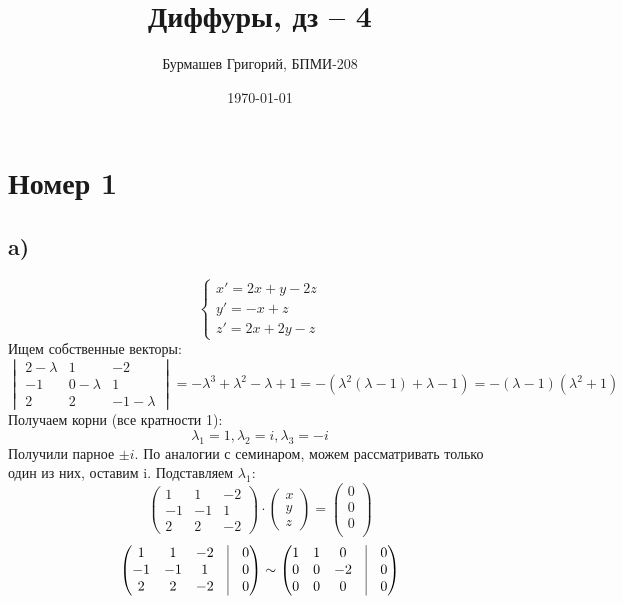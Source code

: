 \documentclass[a4paper,12pt]{article}
\author{Бурмашев Григорий, БПМИ-208}
\title{Диффуры, дз -- 4}
\date{\today}
\begin{document}
\maketitle
\clearpage
\section*{Номер 1}
\subsection*{a)}
\[
\begin{cases}
x' = 2x + y - 2z \\
y' = -x + z \\
z' = 2x + 2y - z
\end{cases}
\]
Ищем собственные векторы:
\[
\begin{vmatrix}
2 - \lambda & 1 & -2 \\
-1 & 0 - \lambda & 1 \\
2 & 2 & -1 - \lambda 
\end{vmatrix}
=
-\lambda^3 + \lambda^2 - \lambda + 1 = -(\lambda^2(\lambda - 1) + \lambda - 1) = -(\lambda - 1)(\lambda^2 + 1)
\]
Получаем корни (все кратности 1):
\[
\lambda_1 = 1, \lambda_2 = i, \lambda_3 = -i
\] 
Получили парное $\pm i$. По аналогии с семинаром, можем рассматривать только один из них, оставим i. Подставляем $\lambda_1$:
\[
\begin{pmatrix}
1& 1 & -2 \\
-1 & -1 & 1 \\
2 & 2 & -2
\end{pmatrix}
\cdot
\begin{pmatrix}
x \\
y \\ 
z
\end{pmatrix}
=
\begin{pmatrix}
0 \\
0 \\ 
0 \\
\end{pmatrix}
\]
\[
\begin{pmatrix}
1 & 1 & -2 & \vrule & 0 \\
-1 & -1 & 1 & \vrule & 0 \\
2 & 2 & -2 & \vrule & 0 \\
\end{pmatrix}
\sim 
\begin{pmatrix}
1 & 1 & 0 & \vrule & 0 \\
0 & 0 & -2 & \vrule & 0 \\
0 & 0 & 0 & \vrule & 0 \\
\end{pmatrix} 
\]
\end{document}
